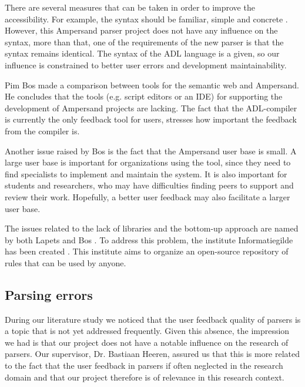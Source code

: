There are several measures that can be taken in order to improve the accessibility.
For example, the syntax should be familiar, simple and concrete .
However, this Ampersand parser project does not have any influence on the syntax, more than that, one of the requirements of the new parser is that the syntax remains identical.
The syntax of the ADL language is a given, so our influence is constrained to better user errors and development maintainability.

Pim Bos  made a comparison between tools for the semantic web and Ampersand.
He concludes that the tools (e.g. script editors or an IDE) for supporting the development of Ampersand projects are lacking.
The fact that the ADL-compiler is currently the only feedback tool for users, stresses how important the feedback from the compiler is.

Another issue raised by Bos is the fact that the Ampersand user base is small.
A large user base is important for organizations using the tool, since they need to find specialists to implement and maintain the system.
It is also important for students and researchers, who may have difficulties finding peers to support and review their work.
Hopefully, a better user feedback may also facilitate a larger user base.

The issues related to the lack of libraries and the bottom-up approach are named by both Lapets  and Bos .
To address this problem, the institute Informatiegilde has been created .
This institute aims to organize an open-source repository of rules that can be used by anyone.

\subsection{Parsing errors}
During our literature study we noticed that the user feedback quality of parsers is a topic that is not yet addressed frequently.
Given this absence, the impression we had is that our project does not have a notable influence on the research of parsers.
Our supervisor, Dr. Bastiaan Heeren, assured us that this is more related to the fact that the user feedback in parsers if often neglected in the research domain and that our project therefore is of relevance in this research context.

